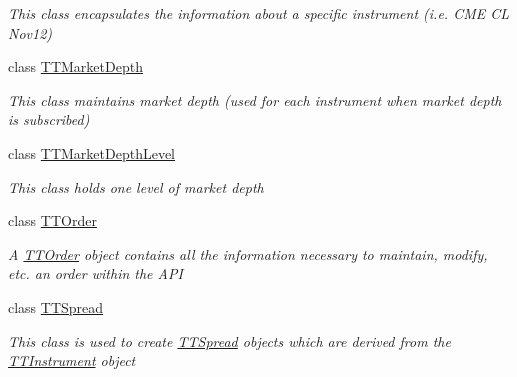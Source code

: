 \begin{DoxyCompactItemize}
\begin{DoxyCompactList}\small\item\em This class encapsulates the information about a specific instrument (i.\-e. C\-M\-E C\-L Nov12) \end{DoxyCompactList}\item 
class \hyperlink{class_e_z_a_p_i_1_1_containers_1_1_t_t_market_depth}{T\-T\-Market\-Depth}
\begin{DoxyCompactList}\small\item\em This class maintains market depth (used for each instrument when market depth is subscribed) \end{DoxyCompactList}\item 
class \hyperlink{class_e_z_a_p_i_1_1_containers_1_1_t_t_market_depth_level}{T\-T\-Market\-Depth\-Level}
\begin{DoxyCompactList}\small\item\em This class holds one level of market depth \end{DoxyCompactList}\item 
class \hyperlink{class_e_z_a_p_i_1_1_containers_1_1_t_t_order}{T\-T\-Order}
\begin{DoxyCompactList}\small\item\em A \hyperlink{class_e_z_a_p_i_1_1_containers_1_1_t_t_order}{T\-T\-Order} object contains all the information necessary to maintain, modify, etc. an order within the A\-P\-I \end{DoxyCompactList}\item 
class \hyperlink{class_e_z_a_p_i_1_1_containers_1_1_t_t_spread}{T\-T\-Spread}
\begin{DoxyCompactList}\small\item\em This class is used to create \hyperlink{class_e_z_a_p_i_1_1_containers_1_1_t_t_spread}{T\-T\-Spread} objects which are derived from the \hyperlink{class_e_z_a_p_i_1_1_containers_1_1_t_t_instrument}{T\-T\-Instrument} object \end{DoxyCompactList}\end{DoxyCompactItemize}
